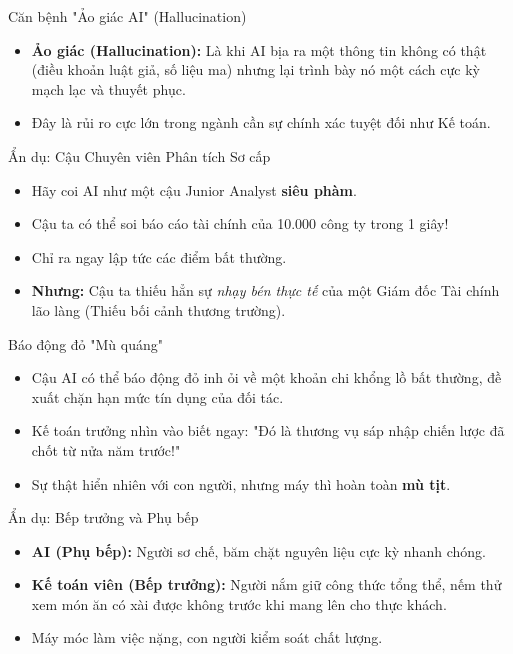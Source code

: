 \documentclass[aspectratio=169,12pt]{beamer}
\begin{document}
\begin{frame}{Căn bệnh "Ảo giác AI" (Hallucination)}
    \begin{itemize}
        \item \textbf{Ảo giác (Hallucination):} Là khi AI bịa ra một thông tin không có thật (điều khoản luật giả, số liệu ma) nhưng lại trình bày nó một cách cực kỳ mạch lạc và thuyết phục.
        \item Đây là rủi ro cực lớn trong ngành cần sự chính xác tuyệt đối như Kế toán.
    \end{itemize}
\end{frame}

\begin{frame}{Ẩn dụ: Cậu Chuyên viên Phân tích Sơ cấp}
    \begin{itemize}
        \item Hãy coi AI như một cậu Junior Analyst \textbf{siêu phàm}.
        \item Cậu ta có thể soi báo cáo tài chính của 10.000 công ty trong 1 giây! 
        \item Chỉ ra ngay lập tức các điểm bất thường.
        \item \textbf{Nhưng:} Cậu ta thiếu hẳn sự \textit{nhạy bén thực tế} của một Giám đốc Tài chính lão làng (Thiếu bối cảnh thương trường).
    \end{itemize}
\end{frame}

\begin{frame}{Báo động đỏ "Mù quáng"}
    \begin{itemize}
        \item Cậu AI có thể báo động đỏ inh ỏi về một khoản chi khổng lồ bất thường, đề xuất chặn hạn mức tín dụng của đối tác.
        \item Kế toán trưởng nhìn vào biết ngay: "Đó là thương vụ sáp nhập chiến lược đã chốt từ nửa năm trước!"
        \item Sự thật hiển nhiên với con người, nhưng máy thì hoàn toàn \textbf{mù tịt}.
    \end{itemize}
\end{frame}

\begin{frame}{Ẩn dụ: Bếp trưởng và Phụ bếp}
    \begin{itemize}
        \item \textbf{AI (Phụ bếp):} Người sơ chế, băm chặt nguyên liệu cực kỳ nhanh chóng.
        \item \textbf{Kế toán viên (Bếp trưởng):} Người nắm giữ công thức tổng thể, nếm thử xem món ăn có xài được không trước khi mang lên cho thực khách.
        \item Máy móc làm việc nặng, con người kiểm soát chất lượng.
    \end{itemize}
\end{frame}
\end{document}
